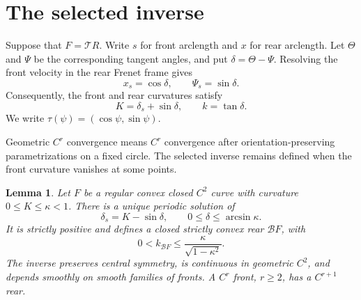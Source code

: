 \documentclass[11pt]{article}
\numberwithin{equation}{section}
\newtheorem{lemma}[theorem]{Lemma}
\newcommand{\Tmap}{\mathcal T}
\newcommand{\Bmap}{\mathcal B}
\begin{document}
\section{The selected inverse}\label{sec:inverse}

Suppose that \(F=\Tmap R\). Write \(s\) for front arclength and \(x\) for
rear arclength. Let \(\Theta\) and \(\Psi\) be the corresponding tangent
angles, and put \(\delta=\Theta-\Psi\). Resolving the front velocity in the
rear Frenet frame gives
\begin{equation}\label{eq:bicycle-s}
  x_s=\cos\delta,\qquad \Psi_s=\sin\delta.
\end{equation}
Consequently, the front and rear curvatures satisfy
\begin{equation}\label{eq:bicycle-curv}
  K=\delta_s+\sin\delta,\qquad k=\tan\delta.
\end{equation}
We write \(\tau(\psi)=(\cos\psi,\sin\psi)\).

Geometric \(C^r\) convergence means \(C^r\) convergence after
orientation-preserving parametrizations on a fixed circle. The selected
inverse remains defined when the front curvature vanishes at some points.

\begin{lemma}\label{lem:inverse}
Let \(F\) be a regular convex closed \(C^2\) curve with curvature
\(0\leq K\leq\kappa<1\). There is a unique periodic solution of
\[
  \delta_s=K-\sin\delta,\qquad 0\leq\delta\leq\arcsin\kappa.
\]
It is strictly positive and defines a closed strictly convex rear
\(\Bmap F\), with
\begin{equation}\label{eq:rear-bound}
  0<k_{\Bmap F}\leq\frac{\kappa}{\sqrt{1-\kappa^2}}.
\end{equation}
The inverse preserves central symmetry, is continuous in geometric \(C^2\),
and depends smoothly on smooth families of fronts. A \(C^r\) front,
\(r\geq2\), has a \(C^{r+1}\) rear.
\end{lemma}
\end{document}
